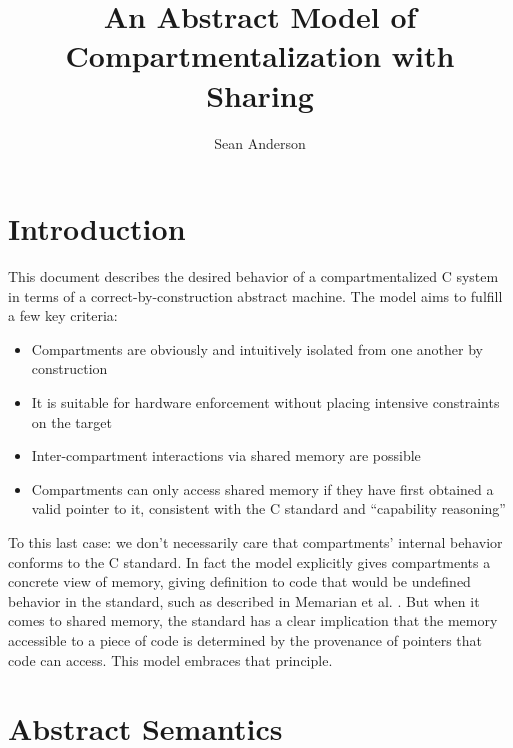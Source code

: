 \documentclass{article}
\title{An Abstract Model of Compartmentalization with Sharing}
\author{Sean Anderson}
\begin{document}
\maketitle




\section{Introduction}

This document describes the desired behavior of a compartmentalized C system in terms
of a correct-by-construction abstract machine. The model aims to fulfill a few key
criteria:

\begin{itemize}
\item Compartments are obviously and intuitively isolated from one another
  by construction
\item It is suitable for hardware enforcement without placing intensive constraints
  on the target
\item Inter-compartment interactions via shared memory are possible
\item Compartments can only access shared memory if they have first obtained a
  valid pointer to it, consistent with the C standard and ``capability reasoning''
\end{itemize}

To this last case: we don't necessarily care that compartments' internal behavior
conforms to the C standard. In fact the model explicitly gives compartments
a concrete view of memory, giving definition to code that would be undefined behavior
in the standard, such as described in Memarian et al. \cite{Memarian19:ExploringCSemantics}.
But when it comes to shared memory, the standard has a clear
implication that the memory accessible to a piece of code is determined by
the provenance of pointers that code can access. This model embraces that principle.

\section{Abstract Semantics}
\end{document}
